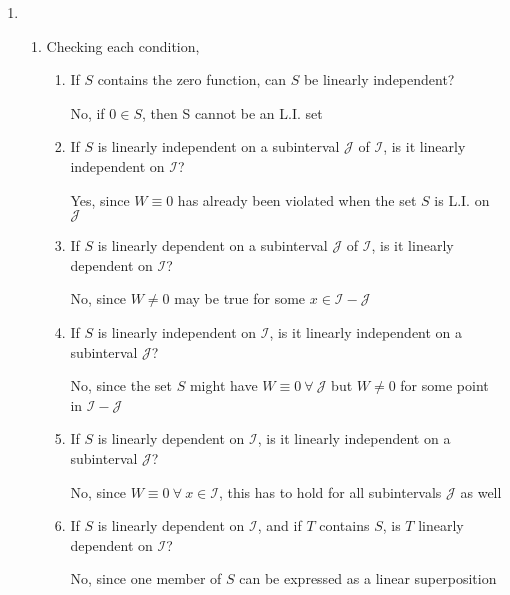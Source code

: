 \begin{enumerate}
    \item \begin{enumerate}
              \item Checking each condition,
                    \begin{enumerate}[itemsep = 2em]
                        \item If $ S $ contains the zero function, can $ S $ be linearly independent?
                              \par {\color{y_p} No}, if $ 0 \in S $, then S cannot be an L.I. set
                        \item If $ S $ is linearly independent on a subinterval $\mathcal{J}$ of $\mathcal{I}$, is it
                              linearly independent on $ \mathcal{I} $?
                              \par {\color{y_h} Yes}, since $ W \equiv 0 $ has already been violated when the set $ S $
                              is L.I. on $ \mathcal{J} $
                        \item If $S$ is linearly dependent on a subinterval $\mathcal{J}$ of $\mathcal{I}$, is it linearly
                              dependent on $\mathcal{I}$?
                              \par {\color{y_p} No}, since $ W \neq 0$ may be true for some
                              $ x \in \mathcal{I} - \mathcal{J} $
                        \item If $S$ is linearly independent on $\mathcal{I}$, is it linearly independent on a
                              subinterval $\mathcal{J}$?
                              \par {\color{y_p} No}, since the set $ S $ might have $ W \equiv 0 \ \forall\ \mathcal{J}$
                              but $ W \neq 0 $ for some point in $ \mathcal{I} - \mathcal{J} $
                        \item If $S$ is linearly dependent on $\mathcal{I}$, is it linearly independent on a
                              subinterval $\mathcal{J}$?
                              \par {\color{y_p} No}, since $ W \equiv 0\ \forall\ x \in \mathcal{I} $, this has to hold
                              for all subintervals $ \mathcal{J} $ as well
                        \item If $S$ is linearly dependent on $\mathcal{I}$, and if $T$ contains $S$, is $T$ linearly
                              dependent on $\mathcal{I}$?
                              \par {\color{y_p} No}, since one member of $ S $ can be expressed as a linear superposition

\end{enumerate}
\end{enumerate}
\end{enumerate}
